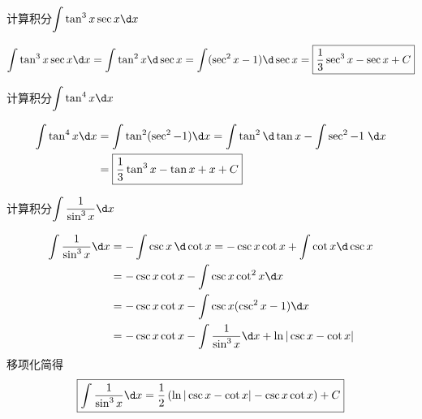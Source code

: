 \documentclass[12pt, a4paper, oneside, UTF8]{ctexbook}
\begin{document}
\begin{example}
    计算积分$\displaystyle \int \tan^3 x \sec x \d x$
\end{example}
\begin{solution}
    \begin{align*}
        \int \tan^3 x \sec x \d x
        =\int \tan^2 x \d \sec x
        =\int (\sec^2 x -1) \d \sec x
        =\boxed{\dfrac{1}{3}\sec^3 x - \sec x + C}
    \end{align*}
\end{solution}
\begin{example}
    计算积分$\displaystyle\int \tan^4 x \d x$
\end{example}
\begin{solution}
    \begin{align*}
        \int \tan^4 x \d x
        &=\int \tan^2 (\sec^2 -1)\d x
        =\int \tan^2 \d \tan x-\int \sec^2 -1\;\d x\\
        &=\boxed{\dfrac{1}{3}\tan^3 x-\tan x+x +C}
    \end{align*}
\end{solution}
\begin{example}
    计算积分$\displaystyle \int \dfrac{1}{\sin^3 x} \d x$
\end{example}
\begin{solution}
    \begin{align*}
        \int \dfrac{1}{\sin^3 x} \d x
        &=-\int \csc x\,\d \cot x = -\csc x\cot x + \int \cot x \d \csc x\\
        &=-\csc x\cot x - \int \csc x \cot^2 x \d x\\
        &=-\csc x\cot x - \int \csc x (\csc^2 x - 1) \d x\\
        &=-\csc x\cot x - \int \dfrac{1}{\sin^3 x} \d x + \ln |\csc x - \cot x|
    \end{align*}
    移项化简得
    \[
        \boxed{\int \dfrac{1}{\sin^3 x} \d x = \dfrac{1}{2} \left( \ln |\csc x - \cot x| -\csc x\cot x \right) + C}
    \]
\end{solution}
\end{document}
